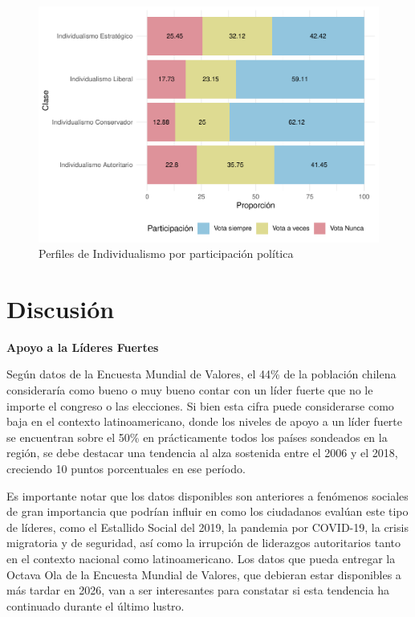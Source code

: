 \documentclass[12pt,oneside]{templates/facsothesis}
\begin{document}
\begin{figure}[!ht]

{\centering \includegraphics[width=1\linewidth,]{tesis_files/figure-latex/unnamed-chunk-11-1} 

}

\caption{Perfiles de Individualismo por participación política}\label{fig:unnamed-chunk-11}
\end{figure}

\hypertarget{discusiuxf3n}{%
\chapter*{Discusión}\label{discusiuxf3n}}

\textbf{Apoyo a la Líderes Fuertes}

Según datos de la Encuesta Mundial de Valores, el 44\% de la población chilena consideraría como bueno o muy bueno contar con un líder fuerte que no le importe el congreso o las elecciones. Si bien esta cifra puede considerarse como baja en el contexto latinoamericano, donde los niveles de apoyo a un líder fuerte se encuentran sobre el 50\% en prácticamente todos los países sondeados en la región, se debe destacar una tendencia al alza sostenida entre el 2006 y el 2018, creciendo 10 puntos porcentuales en ese período.

Es importante notar que los datos disponibles son anteriores a fenómenos sociales de gran importancia que podrían influir en como los ciudadanos evalúan este tipo de líderes, como el Estallido Social del 2019, la pandemia por COVID-19, la crisis migratoria y de seguridad, así como la irrupción de liderazgos autoritarios tanto en el contexto nacional como latinoamericano. Los datos que pueda entregar la Octava Ola de la Encuesta Mundial de Valores, que debieran estar disponibles a más tardar en 2026, van a ser interesantes para constatar si esta tendencia ha continuado durante el último lustro.
\end{document}
